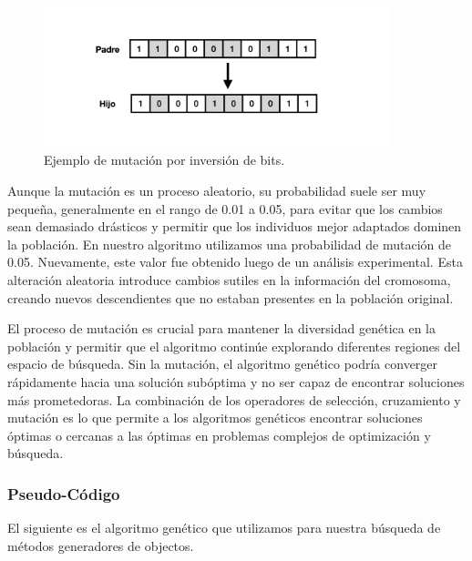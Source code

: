 \begin{figure}[h]
\centering
\includegraphics[width=0.9\textwidth]{images/mutation.png}
\caption{Ejemplo de mutación por inversión de bits.}
\label{fig:mutation}
\end{figure}

Aunque la mutación es un proceso aleatorio, su probabilidad suele ser muy pequeña, generalmente en el rango de 0.01 a 0.05, para evitar que los cambios sean demasiado drásticos y permitir que los individuos mejor adaptados dominen la población. En nuestro algoritmo utilizamos una probabilidad de mutación de 0.05. Nuevamente, este valor fue obtenido luego de un análisis experimental. Esta alteración aleatoria introduce cambios sutiles en la información del cromosoma, creando nuevos descendientes que no estaban presentes en la población original.

El proceso de mutación es crucial para mantener la diversidad genética en la población y permitir que el algoritmo continúe explorando diferentes regiones del espacio de búsqueda. Sin la mutación, el algoritmo genético podría converger rápidamente hacia una solución subóptima y no ser capaz de encontrar soluciones más prometedoras. La combinación de los operadores de selección, cruzamiento y mutación es lo que permite a los algoritmos genéticos encontrar soluciones óptimas o cercanas a las óptimas en problemas complejos de optimización y búsqueda.



\subsubsection{Pseudo-Código}

El siguiente es el algoritmo genético que utilizamos para nuestra búsqueda de métodos generadores de objectos.

